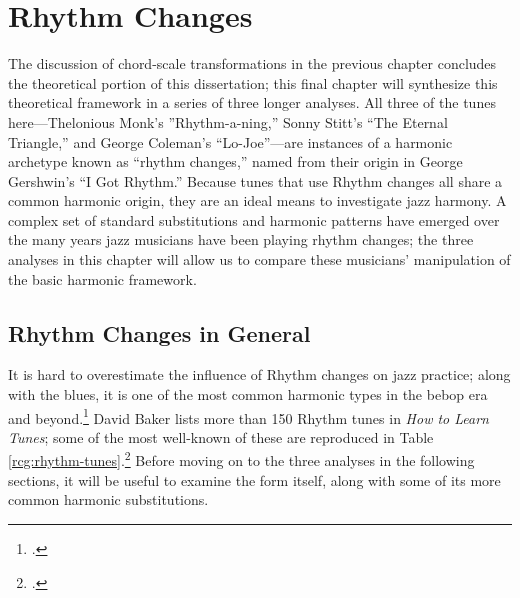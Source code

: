 
\chapter{Rhythm Changes}
\label{chap:rhythm-changes}
\addtocspace
{}

The discussion of chord-scale transformations in the previous chapter
concludes the theoretical portion of this dissertation; this final chapter
will synthesize this theoretical framework in a series of three longer
analyses. All three of the tunes here---Thelonious Monk's ''Rhythm-a-ning,''
Sonny Stitt's ``The Eternal Triangle,'' and George Coleman's ``Lo-Joe''---are
instances of a harmonic archetype known as ``rhythm changes,'' named from
their origin in George Gershwin's ``I Got Rhythm.'' Because tunes
that use Rhythm changes all share a common harmonic origin, they are an ideal
means to investigate jazz harmony. A complex set of standard substitutions and
harmonic patterns have emerged over the many years jazz musicians have been
playing rhythm changes; the three analyses in this chapter will allow us to
compare these musicians' manipulation of the basic harmonic framework.

\section{Rhythm Changes in General}
\label{sec:rhythm-changes-general}

It is hard to overestimate the influence of Rhythm changes on jazz practice;
along with the blues, it is one of the most common harmonic types in the bebop
era and beyond.\footcite[13]{owens:1995} David Baker lists more than 150
Rhythm tunes in \emph{How to Learn Tunes}; some of the most well-known
of these are reproduced in Table
\ref{rcg:rhythm-tunes}.\footcite[42--44]{baker:tunes} Before moving on to the
three analyses in the following sections, it will be useful to examine the
form itself, along with some of its more common harmonic substitutions.


